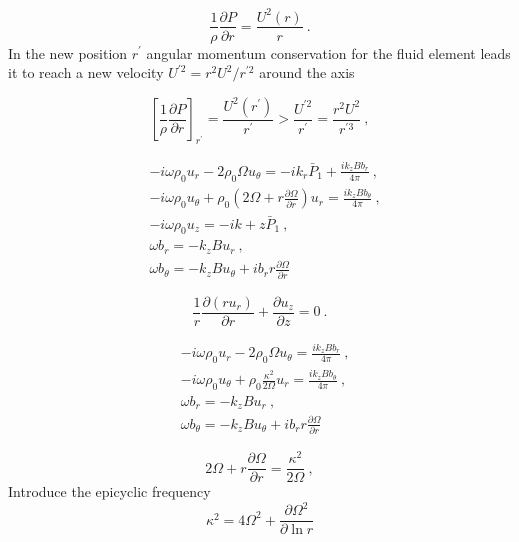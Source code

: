 \documentclass[12pt,a4paper]{article}
\begin{document}
\begin{equation}
\frac{1}{\rho } \frac{\partial P}{\partial r} = \frac{U^2(r)}{r} ~.
\end{equation}
In the new position $r^\prime$ angular momentum conservation for the fluid element leads it to reach a new velocity $U^{\prime 2} = r^2 U^2/r^{\prime 2}$ around the axis

\begin{equation}
\left[ \frac{1}{\rho } \frac{\partial P}{\partial r} \right]_{r^\prime} = \frac{U^2(r^\prime)}{r^\prime} > \frac{U^{\prime 2} }{r^\prime} = \frac{r^2 U^2}{r^{\prime 3}} ~,
\end{equation}

\begin{align}
& -i \omega \rho_0 u_r - 2\rho_0 \Omega u_\theta = -i k_r \bar{P}_1  + \frac{ik_z B b_r}{4\pi} ~, \\
& -i \omega \rho_0 u_\theta +\rho_0 \left( 2\Omega +r \frac{\partial \Omega}{\partial r} \right) u_r = \frac{ik_z B b_\theta}{4\pi} ~, \\
& -i \omega \rho_0 u_z = -ik+z \bar{P}_1 ~, \\
& \omega b_r = -k_z B u_r ~, \\
& \omega b_\theta = -k_z B u_\theta +i b_r r \frac{\partial \Omega}{\partial r}
\end{align}

\begin{equation*}
\frac{1}{r}  \frac{\partial (r u_r) }{\partial r} +  \frac{\partial u_z}{\partial z} = 0 ~.
\end{equation*}

\begin{align}
&  -i \omega \rho_0 u_r - 2\rho_0 \Omega u_\theta = \frac{ik_z B b_r}{4\pi} ~,\\
& -i \omega \rho_0 u_\theta +\rho_0 \frac{\kappa^2}{2\Omega} u_r = \frac{ik_z B b_\theta}{4\pi} ~,\\
& \omega b_r = -k_z B u_r ~, \\
& \omega b_\theta = -k_z B u_\theta +i b_r r \frac{\partial \Omega}{\partial r}
\end{align}

\begin{equation*}
2\Omega +r \frac{\partial \Omega}{\partial r} = \frac{\kappa^2}{2\Omega} ~,
\end{equation*}
Introduce the epicyclic frequency
\begin{equation}
\kappa^2 = 4 \Omega^2 + \frac{\partial \Omega^2}{\partial \ln r}
\end{equation}
\end{document}
